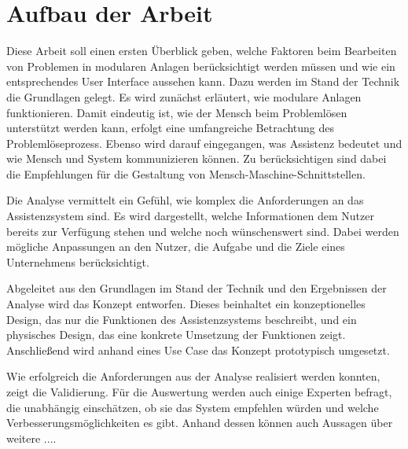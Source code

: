\section{Aufbau der Arbeit}
Diese Arbeit soll einen ersten Überblick geben, welche Faktoren beim Bearbeiten von Problemen in modularen Anlagen berücksichtigt werden müssen und wie ein entsprechendes User Interface aussehen kann. Dazu werden im Stand der Technik die Grundlagen gelegt. Es wird zunächst erläutert, wie modulare Anlagen funktionieren. Damit eindeutig ist, wie der Mensch beim Problemlösen unterstützt werden kann, erfolgt eine umfangreiche Betrachtung des Problemlöseprozess. Ebenso wird darauf eingegangen, was Assistenz bedeutet und wie Mensch und System kommunizieren können. Zu berücksichtigen sind dabei die Empfehlungen für die Gestaltung von Mensch-Maschine-Schnittstellen.

Die Analyse vermittelt ein Gefühl, wie komplex die Anforderungen an das Assistenzsystem sind. Es wird dargestellt, welche Informationen dem Nutzer bereits zur Verfügung stehen und welche noch wünschenswert sind. Dabei werden mögliche Anpassungen an den Nutzer, die Aufgabe und die Ziele eines Unternehmens berücksichtigt.

Abgeleitet aus den Grundlagen im Stand der Technik und den Ergebnissen der Analyse wird das Konzept entworfen. Dieses beinhaltet ein konzeptionelles Design, das nur die Funktionen des Assistenzsystems beschreibt, und ein physisches Design, das eine konkrete Umsetzung der Funktionen zeigt. Anschließend wird anhand eines Use Case das Konzept prototypisch umgesetzt.

Wie erfolgreich die Anforderungen aus der Analyse realisiert werden konnten, zeigt die Validierung. Für die Auswertung werden auch einige Experten befragt, die unabhängig einschätzen, ob sie das System empfehlen würden und welche Verbesserungsmöglichkeiten es gibt. Anhand dessen können auch Aussagen über weitere .... 